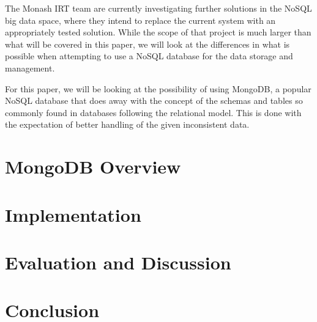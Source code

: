 \documentclass[a4paper,11pt]{article}
\begin{document}
The Monash IRT team are currently investigating further solutions in the NoSQL big data space, where they intend to
replace the current system with an appropriately tested solution. While the scope of that project is much larger than
what will be covered in this paper, we will look at the differences in what is possible when attempting to use a NoSQL
database for the data storage and management.

For this paper, we will be looking at the possibility of using MongoDB, a popular NoSQL database that does away with
the concept of the schemas and tables so commonly found in databases following the relational model. This is done with
the expectation of better handling of the given inconsistent data.


\newpage

\section{MongoDB Overview} %
\label{sec:mongo_overview}


\newpage

\section{Implementation} %
\label{sec:implementation}


\newpage

\section{Evaluation and Discussion} %
\label{sec:evaluation_and_discussion}


\newpage

\section{Conclusion} %
\label{sec:conclusion}


\newpage                            %



\end{document}
